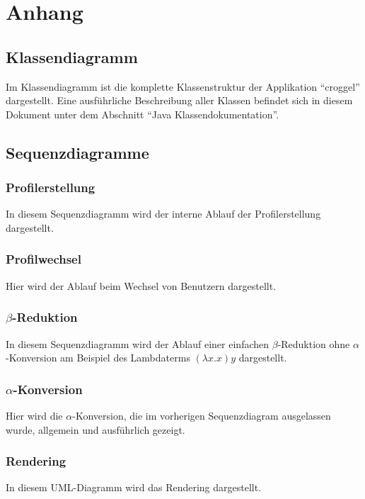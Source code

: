 \chapter{Anhang}
\section{Klassendiagramm}
	Im Klassendiagramm ist die komplette Klassenstruktur der Applikation "`croggel"' dargestellt. 
	Eine ausführliche Beschreibung aller Klassen befindet sich in diesem Dokument unter dem Abschnitt "`Java Klassendokumentation"'. 

\section{Sequenzdiagramme}
	\subsection{Profilerstellung}
		In diesem Sequenzdiagramm wird der interne Ablauf der Profilerstellung dargestellt.

	\subsection{Profilwechsel}
		Hier wird der Ablauf beim Wechsel von Benutzern dargestellt.

	\subsection{\(\beta\)-Reduktion}
		In diesem Sequenzdiagramm wird der Ablauf einer einfachen \(\beta\)-Reduktion ohne \(\alpha\)-Konversion am Beispiel des Lambdaterms \((\lambda x.x) y\) dargestellt.

	\subsection{\(\alpha\)-Konversion}
		Hier wird die \(\alpha\)-Konversion, die im vorherigen Sequenzdiagram ausgelassen wurde, allgemein und ausführlich gezeigt.  

	\subsection{Rendering}
		In diesem UML-Diagramm wird das Rendering dargestellt.
